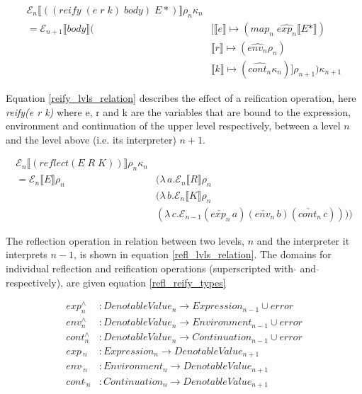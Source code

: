 \documentclass{article}
\theoremstyle{definition}
\begin{document}
\begin{equation}
	\begin{split}
		\mathcal{E}_n \llbracket ((reify\;(e\;r\;k)\;body)\;E*) \rrbracket \rho_n \kappa_n \\
		= \mathcal{E}_{n+1} \llbracket body \rrbracket (& [\llbracket e \rrbracket \mapsto (map_n \; \hat{exp_{n}} \llbracket E* \rrbracket) \\
		& \llbracket r \rrbracket \mapsto (\hat{env_{n}}  \rho_n) \\
		& \llbracket k \rrbracket \mapsto (\hat{cont_{n}} \kappa_n)]\rho_{n+1}) \kappa_{n+1} \label{reify_lvls_relation}
	\end{split}
\end{equation}

Equation \ref{reify_lvls_relation} describes the effect of a reification operation, here \textit{reify(e r k)} where e, r and k are the variables that are bound to the expression, environment and continuation of the upper level respectively, between a level $n$ and the level above (i.e. its interpreter) $n+1$.

\begin{equation}
	\begin{split}
	\mathcal{E}_n \llbracket (reflect (E\;R\;K)) \rrbracket \rho_n \kappa_n \\
	= \mathcal{E}_n \llbracket E \rrbracket \rho_n & (\lambda\,a.\mathcal{E}_n \llbracket R \rrbracket \rho_n \\
										& (\lambda\,b.\mathcal{E}_n \llbracket K \rrbracket \rho_n \\
										& (\lambda\,c.\mathcal{E}_{n-1} (\check{exp_n}\,a)(\check{env_n}\,b)(\check{cont_n}\,c)))) \label{refl_lvls_relation}
	\end{split}									
\end{equation}

The reflection operation in relation between two levels, $n$ and the interpreter it interprets $n-1$, is shown in equation \ref{refl_lvls_relation}. The domains for individual reflection and reification operations (superscripted with $\hat{}$ and $\check{}$ respectively), are given equation \ref{refl_reify_types}

\begin{equation}
	\begin{split}
		exp^\wedge_n & : DenotableValue_n \rightarrow Expression_{n-1} \cup {error}		\\
		env^\wedge_n & : DenotableValue_n \rightarrow Environment_{n-1} \cup {error}	\\
		cont^\wedge_n & : DenotableValue_n \rightarrow Continuation_{n-1} \cup {error} 	\\
		exp\,\check{}_{n} & : Expression_{n} \rightarrow DenotableValue_{n+1}			\\
		env\,\check{}_{n} & : Environment_{n} \rightarrow DenotableValue_{n+1}			\\
		cont\,\check{}_{n} & : Continuation_{n} \rightarrow DenotableValue_{n+1}		\label{refl_reify_types}
	\end{split}
\end{equation}
\end{document}
